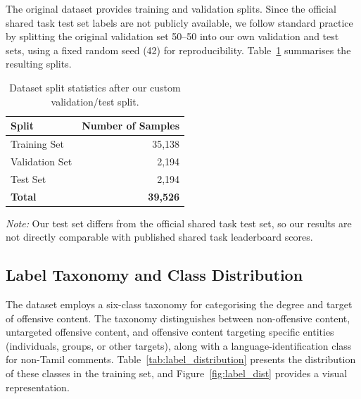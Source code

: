 \documentclass[12pt, a4paper]{article}
\begin{document}
The original dataset provides training and validation splits. Since the official shared task test set labels are not publicly available, we follow standard practice by splitting the original validation set 50--50 into our own validation and test sets, using a fixed random seed (42) for reproducibility. Table~\ref{tab:dataset_splits} summarises the resulting splits.

\begin{table}[!htbp]
\centering
\caption{Dataset split statistics after our custom validation/test split.}
\label{tab:dataset_splits}
\begin{tabular}{l r}
\toprule
\textbf{Split} & \textbf{Number of Samples} \\
\midrule
Training Set   & 35,138 \\
Validation Set & 2,194 \\
Test Set       & 2,194 \\
\midrule
\textbf{Total} & \textbf{39,526} \\
\bottomrule
\end{tabular}

\vspace{0.5em}
\small\textit{Note:} Our test set differs from the official shared task test set, so our results are not directly comparable with published shared task leaderboard scores.
\end{table}

\vspace{1em}

\subsection{Label Taxonomy and Class Distribution}

The dataset employs a six-class taxonomy for categorising the degree and target of offensive content. The taxonomy distinguishes between non-offensive content, untargeted offensive content, and offensive content targeting specific entities (individuals, groups, or other targets), along with a language-identification class for non-Tamil comments. Table~\ref{tab:label_distribution} presents the distribution of these classes in the training set, and Figure~\ref{fig:label_dist} provides a visual representation.
\end{document}
